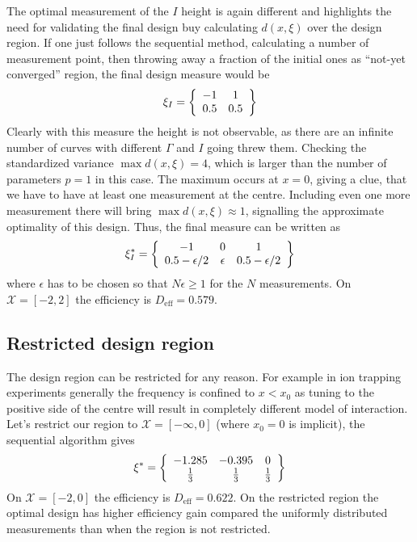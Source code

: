 \documentclass[12pt]{iopart}
\begin{document}
The optimal measurement of the $I$ height is again different and highlights the need for validating the final design buy calculating $d(x, \xi)$ over the design region. If one just follows the sequential method, calculating a number of measurement point, then throwing away a fraction of the initial ones as ``not-yet converged'' region, the final design measure would be
\begin{equation}
\xi_{I} = \left\{ 
  \begin{array}{c c}
    -1 &  1 \\
    0.5 & 0.5\\
  \end{array} \right \}
\end{equation}
Clearly with this measure the height is not observable, as there are an infinite number of curves with different $\Gamma$ and $I$ going threw them. Checking the standardized variance $\max d(x, \xi) = 4$, which is larger than the number of parameters $p = 1$ in this case. The maximum occurs at $x = 0$, giving a clue, that we have to have at least one measurement at the centre. Including even one more measurement there will bring $\max d(x, \xi) \approx 1$, signalling the approximate optimality of this design. Thus, the final measure can be written as
\begin{equation}
\xi^*_{I} = \left\{ 
  \begin{array}{c c c}
    -1 & 0 &  1 \\
    0.5-\epsilon/2 & \epsilon & 0.5-\epsilon/2\\
  \end{array} \right \}
\end{equation}
where $\epsilon$ has to be chosen so that $N \epsilon \geq 1$ for the $N$ measurements. On $\mathcal{X} = [-2,2]$ the efficiency is $D_\mathrm{eff} = 0.579$.

\subsection{Restricted design region}

The design region can be restricted for any reason. For example in ion trapping experiments generally the frequency is confined to $x < x_0$ as tuning to the positive side of the centre will result in completely different model of interaction. Let's restrict our region to $\mathcal{X} = [-\infty, 0]$ (where $x_0 = 0$ is implicit), the sequential algorithm gives
\begin{equation}
\xi^* = \left\{ 
  \begin{array}{c c c}
    -1.285 & -0.395 &  0 \\
     \frac{1}{3} & \frac{1}{3} & \frac{1}{3}\\
  \end{array} \right \}
\end{equation}
On $\mathcal{X} = [-2,0]$ the efficiency is $D_\mathrm{eff} = 0.622$. On the restricted region the optimal design has higher efficiency gain compared the uniformly distributed measurements than when the region is not restricted.
\end{document}
